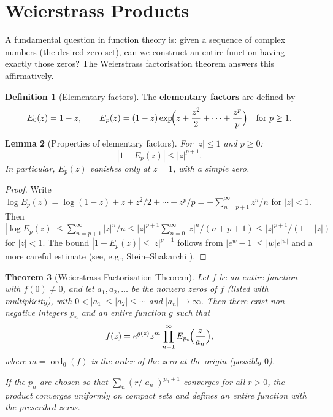 \documentclass[12pt,a4paper,openany]{book}
\theoremstyle{definition}
\newtheorem{definition}{Definition}[chapter]
\theoremstyle{plain}
\newtheorem{theorem}[definition]{Theorem}
\newtheorem{lemma}[definition]{Lemma}
\theoremstyle{remark}
\newcommand{\abs}[1]{\left|#1\right|}
\DeclareMathOperator{\ord}{ord}
\begin{document}
\section{Weierstrass Products}\label{sec:weierstrass-products}

A fundamental question in function theory is: given a sequence of complex
numbers (the desired zero set), can we construct an entire function
having exactly those zeros? The Weierstrass factorisation theorem answers
this affirmatively.

\begin{definition}[Elementary factors]\label{def:elementary-factors}
The \textbf{elementary factors} are defined by
\[
  E_0(z) = 1 - z, \qquad
  E_p(z) = (1-z)\exp\!\Bigl(z + \frac{z^2}{2} + \cdots + \frac{z^p}{p}\Bigr)
  \quad \text{for } p \geq 1.
\]
\end{definition}

\begin{lemma}[Properties of elementary factors]\label{lem:elementary-factors-props}
For $\abs{z} \leq 1$ and $p \geq 0$:
\begin{equation}\label{eq:elementary-bound}
  \abs{1 - E_p(z)} \leq \abs{z}^{p+1}.
\end{equation}
In particular, $E_p(z)$ vanishes only at $z = 1$, with a simple zero.
\end{lemma}

\begin{proof}
Write $\log E_p(z) = \log(1-z) + z + z^2/2 + \cdots + z^p/p
= -\sum_{n=p+1}^{\infty} z^n/n$ for $\abs{z} < 1$. Then
$\abs{\log E_p(z)} \leq \sum_{n=p+1}^{\infty} \abs{z}^n/n
\leq \abs{z}^{p+1}\sum_{n=0}^{\infty}\abs{z}^n/(n+p+1)
\leq \abs{z}^{p+1}/(1-\abs{z})$ for $\abs{z}<1$.
The bound $\abs{1 - E_p(z)} \leq \abs{z}^{p+1}$ follows from
$\abs{e^w - 1} \leq \abs{w}e^{\abs{w}}$ and a more careful estimate
(see, e.g., Stein--Shakarchi \cite{stein2003}).
\end{proof}

\begin{theorem}[Weierstrass Factorisation Theorem]\label{thm:weierstrass-factorisation}
Let $f$ be an entire function with $f(0) \neq 0$, and let
$a_1, a_2, \ldots$ be the nonzero zeros of $f$ (listed with multiplicity),
with $0 < \abs{a_1} \leq \abs{a_2} \leq \cdots$ and $\abs{a_n} \to \infty$.
Then there exist non-negative integers $p_n$ and an entire function $g$
such that
\begin{equation}\label{eq:weierstrass-product}
  f(z) = e^{g(z)} z^m \prod_{n=1}^{\infty} E_{p_n}\!\Bigl(\frac{z}{a_n}\Bigr),
\end{equation}
where $m = \ord_0(f)$ is the order of the zero at the origin (possibly $0$).

If the $p_n$ are chosen so that $\sum_n (r/\abs{a_n})^{p_n+1}$ converges
for all $r > 0$, the product converges uniformly on compact sets
and defines an entire function with the prescribed zeros.
\end{theorem}
\end{document}
